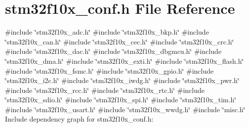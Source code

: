 \section{stm32f10x\+\_\+conf.\+h File Reference}
\label{stm32f10x__conf_8h}
{\ttfamily \#include \char`\"{}stm32f10x\+\_\+adc.\+h\char`\"{}}\newline
{\ttfamily \#include \char`\"{}stm32f10x\+\_\+bkp.\+h\char`\"{}}\newline
{\ttfamily \#include \char`\"{}stm32f10x\+\_\+can.\+h\char`\"{}}\newline
{\ttfamily \#include \char`\"{}stm32f10x\+\_\+cec.\+h\char`\"{}}\newline
{\ttfamily \#include \char`\"{}stm32f10x\+\_\+crc.\+h\char`\"{}}\newline
{\ttfamily \#include \char`\"{}stm32f10x\+\_\+dac.\+h\char`\"{}}\newline
{\ttfamily \#include \char`\"{}stm32f10x\+\_\+dbgmcu.\+h\char`\"{}}\newline
{\ttfamily \#include \char`\"{}stm32f10x\+\_\+dma.\+h\char`\"{}}\newline
{\ttfamily \#include \char`\"{}stm32f10x\+\_\+exti.\+h\char`\"{}}\newline
{\ttfamily \#include \char`\"{}stm32f10x\+\_\+flash.\+h\char`\"{}}\newline
{\ttfamily \#include \char`\"{}stm32f10x\+\_\+fsmc.\+h\char`\"{}}\newline
{\ttfamily \#include \char`\"{}stm32f10x\+\_\+gpio.\+h\char`\"{}}\newline
{\ttfamily \#include \char`\"{}stm32f10x\+\_\+i2c.\+h\char`\"{}}\newline
{\ttfamily \#include \char`\"{}stm32f10x\+\_\+iwdg.\+h\char`\"{}}\newline
{\ttfamily \#include \char`\"{}stm32f10x\+\_\+pwr.\+h\char`\"{}}\newline
{\ttfamily \#include \char`\"{}stm32f10x\+\_\+rcc.\+h\char`\"{}}\newline
{\ttfamily \#include \char`\"{}stm32f10x\+\_\+rtc.\+h\char`\"{}}\newline
{\ttfamily \#include \char`\"{}stm32f10x\+\_\+sdio.\+h\char`\"{}}\newline
{\ttfamily \#include \char`\"{}stm32f10x\+\_\+spi.\+h\char`\"{}}\newline
{\ttfamily \#include \char`\"{}stm32f10x\+\_\+tim.\+h\char`\"{}}\newline
{\ttfamily \#include \char`\"{}stm32f10x\+\_\+usart.\+h\char`\"{}}\newline
{\ttfamily \#include \char`\"{}stm32f10x\+\_\+wwdg.\+h\char`\"{}}\newline
{\ttfamily \#include \char`\"{}misc.\+h\char`\"{}}\newline
Include dependency graph for stm32f10x\+\_\+conf.\+h\+:
